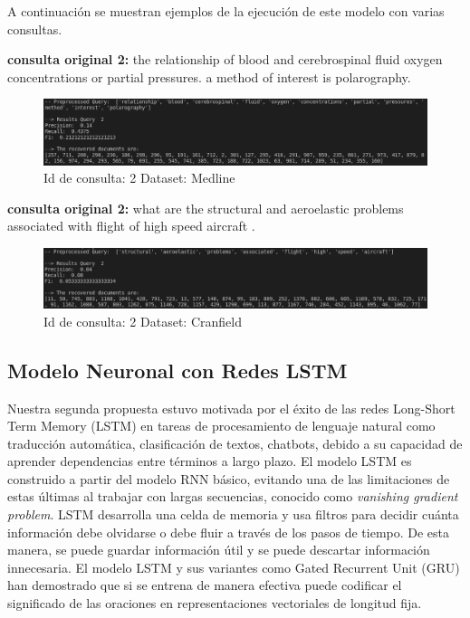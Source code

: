 \documentclass{llncs}
\begin{document}
A continuación se muestran ejemplos de la ejecución de este modelo con varias consultas.

\textbf{consulta original 2: } the relationship of blood and cerebrospinal fluid oxygen concentrations
or partial pressures.  a method of interest is polarography.


\begin{figure}
	\begin{center}
		\includegraphics[width=\linewidth]{ ./images/v-med-q2.png}
		\caption{ Id de consulta: 2  Dataset: Medline }
		\label{vect_q1}
	\end{center}
\end{figure}


\textbf{consulta original 2: } what are the structural and aeroelastic problems associated with flight of high speed aircraft .

\begin{figure}
	\begin{center}
		\includegraphics[width=\linewidth]{ ./images/v-cran-q2.png}
		\caption{ Id de consulta: 2  Dataset: Cranfield }
		\label{vect_q4}
	\end{center}
\end{figure}


\subsection{Modelo Neuronal con Redes LSTM}

Nuestra segunda propuesta estuvo motivada por el éxito de las redes Long-Short Term Memory (LSTM) en tareas de procesamiento de lenguaje natural como traducción automática, clasificación de textos, chatbots, debido a su capacidad de aprender dependencias entre términos a largo plazo. El modelo LSTM es construido a partir del modelo RNN básico, evitando una de las limitaciones de estas últimas al trabajar con largas secuencias, conocido como \textit{vanishing gradient problem}. 
LSTM desarrolla una celda de memoria y usa filtros para decidir cuánta información debe olvidarse o debe fluir a través de los pasos de tiempo. De esta manera, se puede guardar información útil y se puede descartar información innecesaria. El modelo LSTM y sus variantes como Gated Recurrent Unit (GRU) han demostrado que si se entrena de manera efectiva puede codificar el significado de las oraciones en representaciones vectoriales de longitud fija. 
\end{document}
